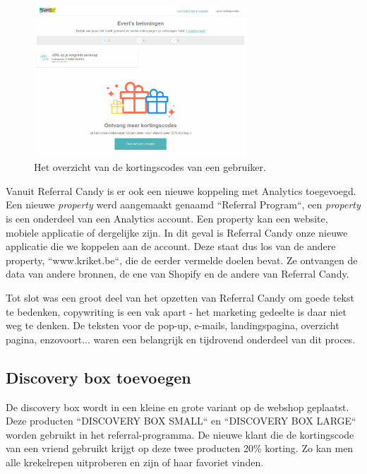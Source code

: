 \begin{figure}[h!]
	\includegraphics[width=80mm,scale=0.9]{img/referral-account.png}
	\centering
	\caption{Het overzicht van de kortingscodes van een gebruiker.}
	\label{fig:referral-account.png}
\end{figure}

Vanuit Referral Candy is er ook een nieuwe koppeling met Analytics toegevoegd. Een nieuwe \emph{property} werd aangemaakt genaamd ``Referral Program``, een \emph{property} is een onderdeel van een Analytics account. Een property kan een website, mobiele applicatie of dergelijke zijn. In dit geval is Referral Candy onze nieuwe applicatie die we koppelen aan de account. Deze staat dus los van de andere property, ``www.kriket.be``, die de eerder vermelde doelen bevat. Ze ontvangen de data van andere bronnen, de ene van Shopify en de andere van Referral Candy.

Tot slot was een groot deel van het opzetten van Referral Candy om goede tekst te bedenken, copywriting is een vak apart - het marketing gedeelte is daar niet weg te denken. De teksten voor de pop-up, e-mails, landingspagina, overzicht pagina, enzovoort... waren een belangrijk en tijdrovend onderdeel van dit proces. 

\subsection{Discovery box toevoegen} \label{sec:aanpassingen-webshop}
De discovery box wordt in een kleine en grote variant op de webshop geplaatst. Deze producten ``DISCOVERY BOX SMALL`` en ``DISCOVERY BOX LARGE`` worden gebruikt in het referral-programma. De nieuwe klant die de kortingscode van een vriend gebruikt krijgt op deze twee producten 20\% korting. Zo kan men alle krekelrepen uitproberen en zijn of haar favoriet vinden.

